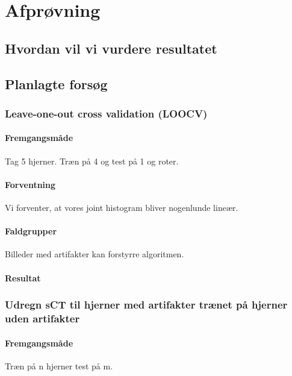 \section{Afprøvning}

\subsection{Hvordan vil vi vurdere resultatet}


\subsection{Planlagte forsøg}

\subsubsection{Leave-one-out cross validation (LOOCV)}
\paragraph{Fremgangsmåde}
Tag 5 hjerner. Træn på 4 og test på 1 og roter.


\paragraph{Forventning}
Vi forventer, at vores joint histogram bliver nogenlunde lineær. 

\paragraph{Faldgrupper}
Billeder med artifakter kan forstyrre algoritmen. 

\paragraph{Resultat}

\subsubsection{Udregn sCT til hjerner med artifakter trænet på hjerner uden artifakter}
\paragraph{Fremgangsmåde}
Træn på n hjerner test på m.

